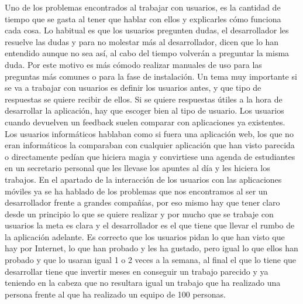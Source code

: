 Uno de los problemas encontrados al trabajar con usuarios, es la cantidad de tiempo que se gasta al tener que hablar con ellos y explicarles cómo funciona cada cosa.
Lo habitual es que los usuarios pregunten dudas, el desarrollador les resuelve las dudas y para no molestar más al desarrollador, dicen que lo han entendido aunque no sea así, al cabo del tiempo volverán a preguntar la misma duda. Por este motivo es más cómodo  realizar manuales de uso para las preguntas más comunes o para la fase de instalación.
Un tema muy importante si se va a trabajar con usuarios es definir los usuarios antes, y que tipo de respuestas se quiere recibir de ellos. Si se quiere respuestas útiles a la hora de desarrollar la aplicación, hay que escoger bien al tipo de usuario. Los usuarios cuando devuelven un feedback suelen comparar con aplicaciones ya existentes.
Los usuarios informáticos hablaban como si fuera una aplicación web, los que no eran informáticos la comparaban con cualquier aplicación que han visto parecida o directamente pedían que hiciera magia y convirtiese  una agenda de estudiantes en un secretario personal que les llevase los apuntes al día y les hiciera los trabajos.
En el apartado de la interacción de los usuarios con las aplicaciones móviles ya se ha hablado de los problemas que nos encontramos al ser un desarrollador frente a grandes compañías, por eso mismo hay que tener claro desde un principio lo que se quiere realizar y por mucho que se trabaje con usuarios la meta es clara y el desarrollador es el que tiene que llevar el rumbo de la aplicación adelante. Es correcto que los usuarios pidan lo que han visto que hay por Internet, lo que han probado y les ha gustado, pero igual lo que ellos han probado y que lo usaran igual 1 o 2 veces a la semana, al final el que lo tiene que desarrollar tiene que invertir meses en conseguir un trabajo parecido y ya teniendo en la cabeza que no resultara igual un trabajo que ha realizado una persona frente al que ha realizado un equipo de 100 personas.






















